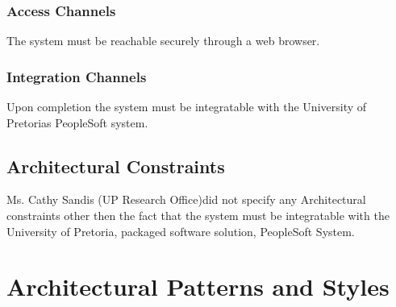 \documentclass[12pt]{article}
\newcommand{\client}{Ms. Cathy Sandis (UP Research Office)}
\begin{document}
\subsubsection{Access Channels}
The system must be reachable securely through a web browser. 

\subsubsection{Integration Channels}
Upon completion the system must be integratable with the University of Pretorias PeopleSoft system.

\subsection{Architectural Constraints}
\client did not specify any Architectural constraints other then the fact that the system must be integratable with the University of Pretoria, packaged software solution, PeopleSoft System. 

% 
\section{Architectural Patterns and Styles} %

\end{document}
